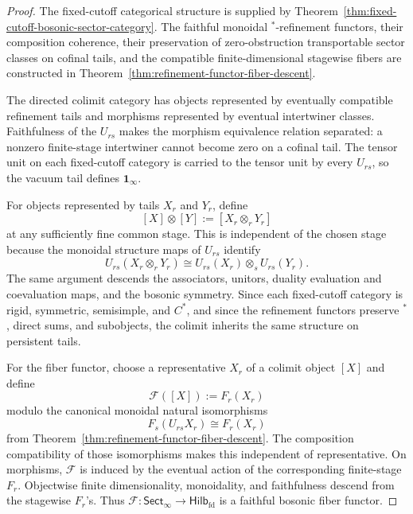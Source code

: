 \documentclass[11pt]{article}
\begin{document}
\begin{proof}
The fixed-cutoff categorical structure is supplied by
Theorem~\ref{thm:fixed-cutoff-bosonic-sector-category}. The faithful monoidal
\(^*\)-refinement functors, their composition coherence, their preservation of zero-obstruction
transportable sector classes on cofinal tails, and the compatible finite-dimensional stagewise
fibers are constructed in Theorem~\ref{thm:refinement-functor-fiber-descent}.

The directed colimit category has objects represented by eventually compatible refinement tails
and morphisms represented by eventual intertwiner classes. Faithfulness of the \(U_{rs}\) makes
the morphism equivalence relation separated: a nonzero finite-stage intertwiner cannot become
zero on a cofinal tail. The tensor unit on each fixed-cutoff category is carried to the tensor
unit by every \(U_{rs}\), so the vacuum tail defines \(\mathbf 1_\infty\).

For objects represented by tails \(X_r\) and \(Y_r\), define
\[
[X]\otimes [Y]:=[X_r\otimes_r Y_r]
\]
at any sufficiently fine common stage. This is independent of the chosen stage because the
monoidal structure maps of \(U_{rs}\) identify
\[
U_{rs}(X_r\otimes_r Y_r)
\cong
U_{rs}(X_r)\otimes_s U_{rs}(Y_r).
\]
The same argument descends the associators, unitors, duality evaluation and coevaluation maps,
and the bosonic symmetry. Since each fixed-cutoff category is rigid, symmetric, semisimple, and
\(C^*\), and since the refinement functors preserve \(^*\), direct sums, and subobjects, the
colimit inherits the same structure on persistent tails.

For the fiber functor, choose a representative \(X_r\) of a colimit object \([X]\) and define
\[
\mathcal F([X]):=F_r(X_r)
\]
modulo the canonical monoidal natural isomorphisms
\[
F_s(U_{rs}X_r)\cong F_r(X_r)
\]
from Theorem~\ref{thm:refinement-functor-fiber-descent}. The composition compatibility of those
isomorphisms makes this independent of representative. On morphisms, \(\mathcal F\) is induced
by the eventual action of the corresponding finite-stage \(F_r\). Objectwise finite
dimensionality, monoidality, and faithfulness descend from the stagewise \(F_r\)'s. Thus
\(\mathcal F:\mathsf{Sect}_\infty\to\mathsf{Hilb}_{\mathrm{fd}}\) is a faithful bosonic fiber
functor.
\end{proof}
\end{document}

